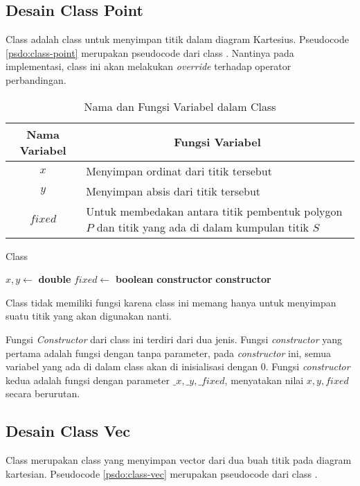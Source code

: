 \subsection{ Desain Class Point}
\label{sec:point}
Class  adalah class untuk menyimpan titik dalam diagram Kartesius. Pseudocode \ref{psdo:class-point} merupakan pseudocode dari class . Nantinya pada implementasi, class ini akan melakukan \textit{override} terhadap operator perbandingan.
\begin{table}[htb]
	\Centering
	\caption{Nama dan Fungsi Variabel dalam Class }
	\begin{tabular}{|c|p{7cm}|}
	\hline
	Nama Variabel & \multicolumn{1}{c|}{Fungsi Variabel}                               \\ \hline
$x$           & Menyimpan ordinat dari titik tersebut  \\ \hline
$y$           & Menyimpan absis dari titik tersebut          \\ \hline
$fixed$             & Untuk membedakan antara titik pembentuk polygon $P$ dan titik yang ada di dalam kumpulan titik $S$   \\ \hline
	\end{tabular}
	\label{tab:var-point}
\end{table}
\begin{algorithm}
	\caption{Class }
	\label{psdo:class-point}
	\begin{algorithmic}[1]
        \State $ x, y \leftarrow $ \textbf{double}
        \State $fixed \leftarrow $ \textbf{boolean}
		\State \textbf{constructor} 
        \State \textbf{constructor} 
	\end{algorithmic}
\end{algorithm}

Class  tidak memiliki fungsi karena class ini memang hanya untuk menyimpan suatu titik yang akan digunakan nanti.

Fungsi \textit{Constructor} dari class ini terdiri dari dua jenis. Fungsi \textit{constructor} yang pertama adalah fungsi dengan tanpa parameter, pada \textit{constructor} ini, semua variabel yang ada di dalam class  akan di inisialisasi dengan $0$. Fungsi \textit{constructor} kedua adalah fungsi dengan parameter $\_x, \_y, \_fixed$, menyatakan nilai $x, y, fixed$ secara berurutan.

\subsection{ Desain Class Vec}
\label{sec:vec}
Class  merupakan class yang menyimpan vector dari dua buah titik pada diagram kartesian. Pseudocode \ref{psdo:class-vec} merupakan pseudocode dari class . 

